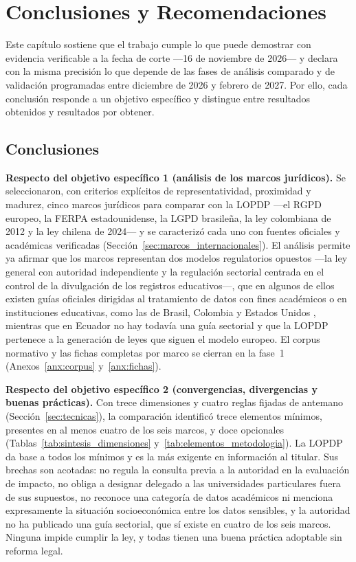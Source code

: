\chapter{Conclusiones y Recomendaciones}
\label{chap:conclusiones}

Este capítulo sostiene que el trabajo cumple lo que puede demostrar con evidencia verificable a la fecha de corte ---16 de noviembre de 2026--- y declara con la misma precisión lo que depende de las fases de análisis comparado y de validación programadas entre diciembre de 2026 y febrero de 2027. Por ello, cada conclusión responde a un objetivo específico y distingue entre resultados obtenidos y resultados por obtener.

\section{Conclusiones}

\textbf{Respecto del objetivo específico 1 (análisis de los marcos jurídicos).} Se seleccionaron, con criterios explícitos de representatividad, proximidad y madurez, cinco marcos jurídicos para comparar con la LOPDP ---el RGPD europeo, la FERPA estadounidense, la LGPD brasileña, la ley colombiana de 2012 y la ley chilena de 2024--- y se caracterizó cada uno con fuentes oficiales y académicas verificadas (Sección~\ref{sec:marcos_internacionales}). El análisis permite ya afirmar que los marcos representan dos modelos regulatorios opuestos ---la ley general con autoridad independiente y la regulación sectorial centrada en el control de la divulgación de los registros educativos---, que en algunos de ellos existen guías oficiales dirigidas al tratamiento de datos con fines académicos o en instituciones educativas, como las de Brasil, Colombia y Estados Unidos \cite{anpd2023academicos,nces2004privacy,sic2026universitario}, mientras que en Ecuador no hay todavía una guía sectorial y que la LOPDP pertenece a la generación de leyes que siguen el modelo europeo. El corpus normativo y las fichas completas por marco se cierran en la fase~1 (Anexos~\ref{anx:corpus} y~\ref{anx:fichas}).

\textbf{Respecto del objetivo específico 2 (convergencias, divergencias y buenas prácticas).} Con trece dimensiones y cuatro reglas fijadas de antemano (Sección~\ref{sec:tecnicas}), la comparación identificó trece elementos mínimos, presentes en al menos cuatro de los seis marcos, y doce opcionales (Tablas~\ref{tab:sintesis_dimensiones} y~\ref{tab:elementos_metodologia}). La LOPDP da base a todos los mínimos y es la más exigente en información al titular. Sus brechas son acotadas: no regula la consulta previa a la autoridad en la evaluación de impacto, no obliga a designar delegado a las universidades particulares fuera de sus supuestos, no reconoce una categoría de datos académicos ni menciona expresamente la situación socioeconómica entre los datos sensibles, y la autoridad no ha publicado una guía sectorial, que sí existe en cuatro de los seis marcos. Ninguna impide cumplir la ley, y todas tienen una buena práctica adoptable sin reforma legal.

